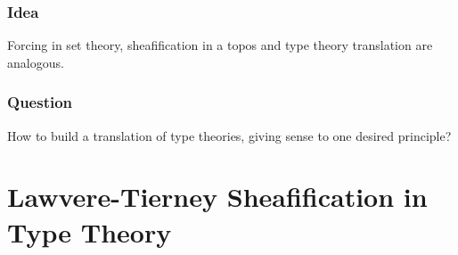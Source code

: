 \documentclass{beamer}
\begin{document}
\begin{frame}
  \frametitle{Idea}
  \begin{center}
    \Large{Forcing in set theory, sheafification in a topos and
      type theory translation are analogous.}
  \end{center}
\end{frame}

\begin{frame}
  \frametitle{Question}

  {\Large How to build a translation of type theories, giving sense to
    one desired principle?}

  \vspace{3em}


\end{frame}

\section[Sheafification]{Lawvere-Tierney Sheafification in Type Theory}
\label{sec:sheaf-type-theory}
\end{document}
